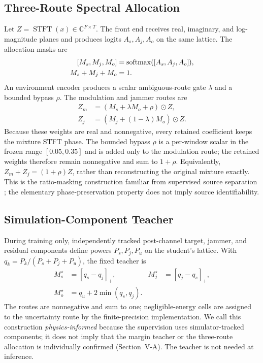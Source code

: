 \documentclass[letterpaper,journal]{IEEEtran}
\newcommand{\STFT}{\operatorname{STFT}}
\newcommand{\softmax}{\operatorname{softmax}}
\begin{document}
\subsection{Three-Route Spectral Allocation}
Let $Z=\STFT(x)\in\mathbb{C}^{F\times T}$. The front end receives real,
imaginary, and log-magnitude planes and produces logits $A_s,A_j,A_o$ on the
same lattice. The allocation masks are
\begin{equation}
\begin{aligned}
\relax[M_s,M_j,M_o]&=\softmax([A_s,A_j,A_o]),\\
M_s+M_j+M_o&=1.
\end{aligned}
\end{equation}
An environment encoder produces a scalar ambiguous-route gate $\lambda$ and a
bounded bypass $\rho$. The modulation and jammer routes are
\begin{align}
Z_m&=(M_s+\lambda M_o+\rho)\odot Z,\\
Z_j&=(M_j+(1-\lambda)M_o)\odot Z.
\end{align}
Because these weights are real and nonnegative, every retained coefficient
keeps the mixture STFT phase. The bounded bypass $\rho$ is a per-window scalar
in the frozen range $[0.05,0.35]$ and is added only to the modulation route;
the retained weights therefore remain nonnegative and sum to $1+\rho$.
Equivalently, $Z_m+Z_j=(1+\rho)Z$, rather than reconstructing the original
mixture exactly. This is the ratio-masking
construction familiar
from supervised source separation \cite{narayanan2013irm,wang2014targets,
erdogan2015psm,williamson2016cirm}; the elementary phase-preservation
property does not imply source identifiability.

\subsection{Simulation-Component Teacher}
During training only, independently tracked post-channel target, jammer, and
residual components define powers $P_s,P_j,P_u$ on the student's lattice. With
$q_k=P_k/(P_s+P_j+P_u)$, the fixed teacher is
\begin{align}
M_s^\star&=[q_s-q_j]_+, & M_j^\star&=[q_j-q_s]_+,\\
M_o^\star&=q_u+2\min(q_s,q_j).
\label{eq:teacher}
\end{align}
The routes are nonnegative and sum to one; negligible-energy cells are assigned
to the uncertainty route by the finite-precision implementation. We call this
construction \emph{physics-informed} because the supervision uses
simulator-tracked components; it does not imply that the margin teacher or the
three-route allocation is individually confirmed (Section~V-A). The teacher is
not needed at inference.
\end{document}
